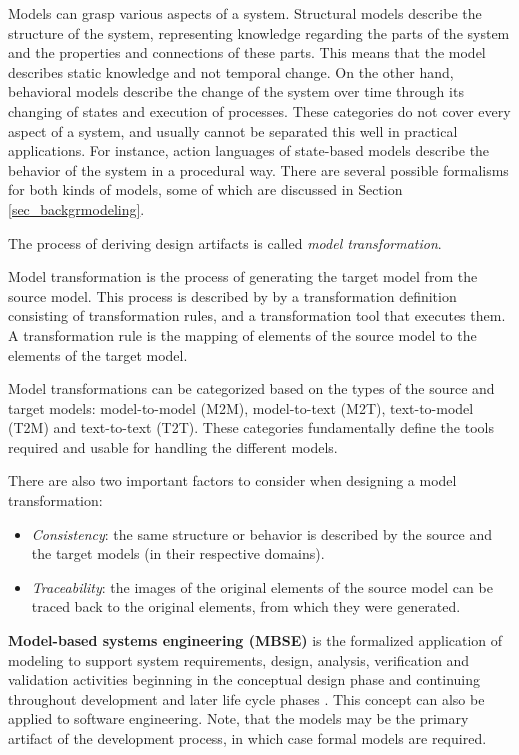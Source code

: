 Models can grasp various aspects of a system. Structural models describe the structure of the system, representing knowledge regarding the parts of the system and the properties and connections of these parts. This means that the model describes static knowledge and not temporal change. On the other hand, behavioral models describe the change of the system over time through its changing of states and execution of processes. These categories do not cover every aspect of a system, and usually cannot be separated this well in practical applications. For instance, action languages of state-based models describe the behavior of the system in a procedural way. There are several possible formalisms for both kinds of models, some of which are discussed in Section \ref{sec_backgrmodeling}.

The process of deriving design artifacts is called \textit{model transformation}.
\begin{definition}
	Model transformation is the process of generating the target model from the source model. This process is described by by a transformation definition consisting of transformation rules, and a transformation tool that executes them. A transformation rule is the mapping of elements of the source model to the elements of the target model. \cite{ModelTransformation}
\end{definition}

Model transformations can be categorized based on the types of the source and target models: model-to-model (M2M), model-to-text (M2T), text-to-model (T2M) and text-to-text (T2T). These categories fundamentally define the tools required and usable for handling the different models.

There are also two important factors to consider when designing a model transformation: 
\begin{itemize}
	\item \textit{Consistency}: the same structure or behavior is described by the source and the target models (in their respective domains).
	\item \textit{Traceability}: the images of the original elements of the source model can be traced back to the original elements, from which they were generated.
\end{itemize}

\textbf{Model-based systems engineering (MBSE)} is the formalized application of modeling to support system requirements, design, analysis, verification and validation activities beginning in the conceptual design phase and continuing throughout development and later life cycle phases \cite{mbse}. This concept can also be applied to software engineering. Note, that the models may be the primary artifact of the development process, in which case formal models are required.

